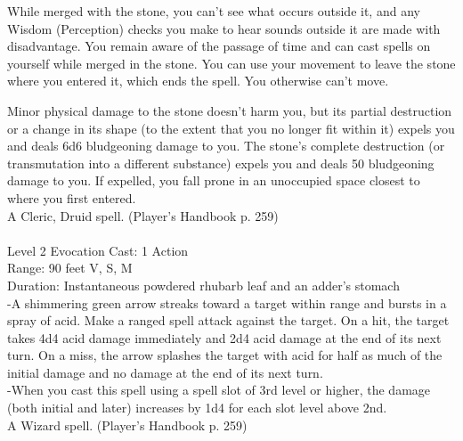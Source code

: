 \documentclass[10pt,twocolumn]{report}
\begin{document}
While merged with the stone, you can’t see what occurs outside it, and any Wisdom (Perception) checks you make to hear sounds outside it are made with disadvantage. You remain aware of the passage of time and can cast spells on yourself while merged in the stone. You can use your movement to leave the stone where you entered it, which ends the spell. You otherwise can’t move.

Minor physical damage to the stone doesn’t harm you, but its partial destruction or a change in its shape (to the extent that you no longer fit within it) expels you and deals 6d6 bludgeoning damage to you. The stone’s complete destruction (or transmutation into a different substance) expels you and deals 50 bludgeoning damage to you. If expelled, you fall prone in an unoccupied space closest to where you first entered.\\
A Cleric, Druid spell. (Player's Handbook p. 259) \\


 \\
Level 2 \quad Evocation \quad Cast: 1 Action\\
Range: 90 feet \quad V, S, M\\
Duration: Instantaneous \quad powdered rhubarb leaf and an adder’s stomach\\
-A shimmering green arrow streaks toward a target within range and bursts in a spray of acid.
Make a ranged spell attack against the target. On a hit, the target takes 4d4 acid damage immediately and 2d4 acid damage at the end of its next turn. On a miss, the arrow splashes the target with acid for half as much of the initial damage and no damage at the end of its next turn.\\
-When you cast this spell using a spell slot of 3rd level or higher, the damage (both initial and later) increases by 1d4 for each slot level above 2nd.\\
A Wizard spell. (Player's Handbook p. 259) \\
\end{document}
